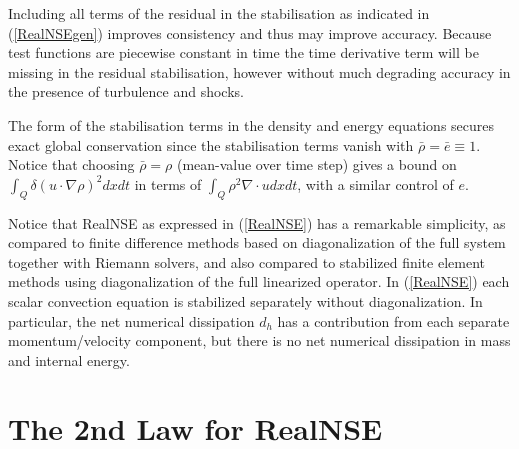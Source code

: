 Including all terms of the residual in the stabilisation as indicated in (\ref{RealNSEgen}) improves consistency and 
thus may improve accuracy. Because test functions are piecewise constant in time the time derivative term
will be missing in the residual stabilisation, however without much degrading accuracy in the presence of turbulence and shocks.

The form of the
stabilisation terms in the density and energy equations
secures exact global conservation since
the stabilisation terms vanish with $\bar\rho =\bar e \equiv 1$.
Notice that choosing $\bar\rho =\rho$ (mean-value
over time step) gives a bound on 
$\int_Q\delta (u\cdot\nabla\rho )^2dxdt$ in terms of 
$\int_Q\rho^2\nabla\cdot udxdt$, with a similar
control of $e$.

Notice that RealNSE as expressed in (\ref{RealNSE}) has a remarkable simplicity,
as compared to finite difference methods based on diagonalization
of the full system together with
Riemann solvers, and also compared to stabilized finite element methods
using diagonalization of the full linearized operator. In (\ref{RealNSE})
each scalar convection equation is stabilized separately 
without diagonalization. In particular, the net numerical 
dissipation $d_h$ has a contribution from each
separate momentum/velocity component, but there is no net
numerical dissipation in mass and internal energy.

\section{The 2nd Law for RealNSE}

